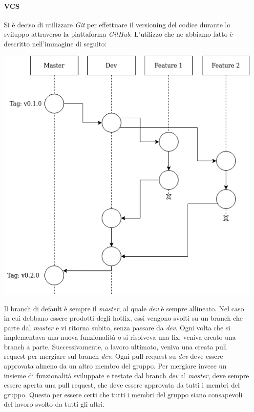 \documentclass{article}
\begin{document}
    \paragraph{VCS}
    Si è deciso di utilizzare \textit{Git} per effettuare il versioning del codice durante lo sviluppo attraverso la piattaforma \textit{GitHub}.
    L’utilizzo che ne abbiamo fatto è descritto nell'immagine di seguito:
    \begin{center}
        \includegraphics[scale=0.5]{git-workflow-1-1}
    \end{center}
    Il branch di default è sempre il \textit{master}, al quale \textit{dev} è sempre allineato.
    Nel caso in cui debbano essere prodotti degli hotfix, essi vengono svolti su un branch che parte dal \textit{master} e vi ritorna subito, senza passare da \textit{dev}.
    Ogni volta che si implementava una nuova funzionalità o si risolveva una fix, veniva creato una branch a parte.
    Successivamente, a lavoro ultimato, veniva una creata pull request per mergiare sul branch \textit{dev}.
    Ogni pull request su \textit{dev} deve essere approvata almeno da un altro membro del gruppo.
    Per mergiare invece un insieme di funzionalità sviluppate e testate dal branch \textit{dev} al \textit{master}, deve sempre essere aperta una pull request, che deve essere approvata da tutti i membri del gruppo.
    Questo per essere certi che tutti i membri del gruppo siano consapevoli del lavoro svolto da tutti gli altri.
\end{document}

